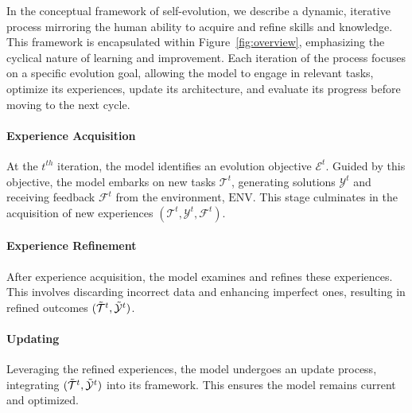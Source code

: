 \documentclass[sn-basic, Numbered]{sn-jnl}%
\def\gE{{\mathcal{E}}}
\def\gF{{\mathcal{F}}}
\def\gT{{\mathcal{T}}}
\def\gY{{\mathcal{Y}}}
\theoremstyle{thmstyleone}%
\theoremstyle{thmstyletwo}%
\theoremstyle{thmstylethree}%
\begin{document}

In the conceptual framework of self-evolution, we describe a dynamic, iterative process mirroring the human ability to acquire and refine skills and knowledge. This framework is encapsulated within Figure~\ref{fig:overview}, emphasizing the cyclical nature of learning and improvement. Each iteration of the process focuses on a specific evolution goal, allowing the model to engage in relevant tasks, optimize its experiences, update its architecture, and evaluate its progress before moving to the next cycle.

\noindent\paragraph{Experience Acquisition}
At the $t^{th}$ iteration, the model identifies an evolution objective $\gE^{t}$. Guided by this objective, the model embarks on new tasks $\gT^{t}$, generating solutions $\gY^{t}$ and receiving feedback $\gF^{t}$ from the environment, $\mathrm{ENV}$. This stage culminates in the acquisition of new experiences ${(\gT^{t}, \gY^{t}, \gF^{t})}$.

\noindent\paragraph{Experience Refinement}
After experience acquisition, the model examines and refines these experiences. This involves discarding incorrect data and enhancing imperfect ones, resulting in refined outcomes ${(\Tilde{\gT}^{t}, \Tilde{\gY}^{t})}$.



\noindent\paragraph{Updating}
Leveraging the refined experiences, the model undergoes an update process, integrating ${(\Tilde{\gT}^{t}, \Tilde{\gY}^{t})}$ into its framework. This ensures the model remains current and optimized.
\end{document}
